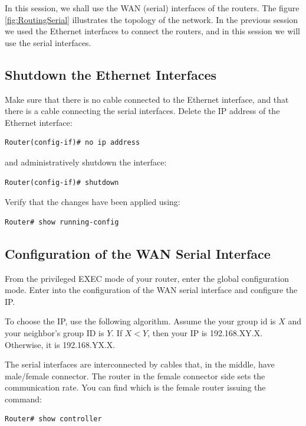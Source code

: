 In this session, we shall use the WAN (serial) interfaces of the routers. The figure \ref{fig:RoutingSerial} illustrates the topology of the network. In the previous session we used the Ethernet interfaces to connect the routers, and in this session we will use the serial interfaces.

\subsection{Shutdown the Ethernet Interfaces}

Make sure that there is no cable connected to the Ethernet interface, and that there is a cable connecting the serial interfaces. Delete the IP address of the Ethernet interface:

\begin{lstlisting}
Router(config-if)# no ip address
\end{lstlisting}

and administratively shutdown the interface:

\begin{lstlisting}
Router(config-if)# shutdown
\end{lstlisting}

Verify that the changes have been applied using:

\begin{lstlisting}
Router# show running-config
\end{lstlisting}

\subsection{Configuration of the WAN Serial Interface}

From the privileged EXEC mode of your router, enter the global configuration mode. Enter into the configuration of the WAN serial interface and configure the IP.

To choose the IP, use the following algorithm. Assume the your group id is $X$ and your neighbor's group ID is $Y$. If $X<Y$, then your IP is 192.168.XY.X. Otherwise, it is 192.168.YX.X.

The serial interfaces are interconnected by cables that, in the middle, have male/female connector. The router in the female connector side sets the communication rate. You can find which is the female router issuing the command:

\begin{lstlisting}
Router# show controller
\end{lstlisting}

